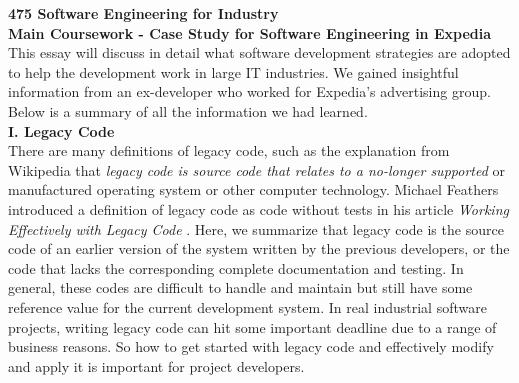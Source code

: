 \documentclass[11pt]{article}
\begin{document}
{\bf 475 Software Engineering for Industry} \\
{\bf Main Coursework - Case Study for Software Engineering in Expedia}\\[10px]
This essay will discuss in detail what software development strategies are adopted to help the development work in large IT industries. We gained insightful information from an ex-developer who worked for Expedia's advertising group. Below is a summary of all the information we had learned.\\[10px]
{\bf I. Legacy Code}\\[10px]
There are many definitions of legacy code, such as the explanation from Wikipedia that \textit{legacy code is source code that relates to a no-longer supported} \cite{no1} or manufactured operating system or other computer technology. Michael Feathers introduced a definition of legacy code as code without tests in his article \textit{Working Effectively with Legacy Code} \cite{no2}. Here, we summarize that legacy code is the source code of an earlier version of the system written by the previous developers, or the code that lacks the corresponding complete documentation and testing. In general, these codes are difficult to handle and maintain but still have some reference value for the current development system. In real industrial software projects, writing legacy code can hit some important deadline due to a range of business reasons. So how to get started with legacy code and effectively modify and apply it is important for project developers.\\[10px]
\end{document}
